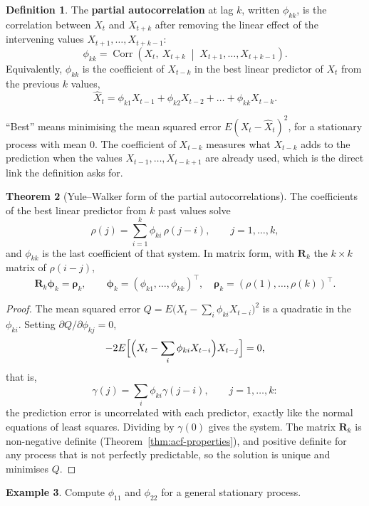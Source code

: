 \documentclass[11pt,a4paper]{article}
\theoremstyle{definition}
\newtheorem{thm}{Theorem}[subsection]
\newtheorem{defn}[thm]{Definition}
\newtheorem{exa}[thm]{Example}
\DeclareMathOperator{\Corr}{Corr}
\begin{document}
\begin{defn}
The \textbf{partial autocorrelation} at lag $k$, written $\phi_{kk}$, is the correlation between $X_t$ and $X_{t+k}$ after removing the
linear effect of the intervening values $X_{t+1}, \dots, X_{t+k-1}$:
\[
\phi_{kk} = \Corr\left(X_t, \ X_{t+k} \;\middle|\; X_{t+1}, \dots, X_{t+k-1}\right) .
\]
Equivalently, $\phi_{kk}$ is the coefficient of $X_{t-k}$ in the best linear predictor of $X_t$ from the previous $k$ values,
\[
\hat X_t = \phi_{k1}X_{t-1} + \phi_{k2}X_{t-2} + \dots + \phi_{kk}X_{t-k} .
\]
\end{defn}

``Best'' means minimising the mean squared error $E(X_t - \hat X_t)^2$, for a stationary process with mean $0$. The coefficient of $X_{t-k}$
measures what $X_{t-k}$ adds to the prediction when the values $X_{t-1}, \dots, X_{t-k+1}$ are already used, which is the direct link the
definition asks for.

\begin{thm}[Yule--Walker form of the partial autocorrelations]\label{thm:pacf-yw}
The coefficients of the best linear predictor from $k$ past values solve
\[
\rho(j) = \sum_{i=1}^{k}\phi_{ki}\,\rho(j - i) , \qquad j = 1, \dots, k ,
\]
and $\phi_{kk}$ is the last coefficient of that system. In matrix form, with $\mathbf{R}_k$ the $k \times k$ matrix of $\rho(i - j)$,
\[
\mathbf{R}_k\boldsymbol\phi_k = \boldsymbol\rho_k , \qquad \boldsymbol\phi_k = (\phi_{k1}, \dots, \phi_{kk})^\top , \quad \boldsymbol\rho_k = (\rho(1), \dots, \rho(k))^\top .
\]
\end{thm}

\begin{proof}
The mean squared error $Q = E\bigl(X_t - \sum_i\phi_{ki}X_{t-i}\bigr)^2$ is a quadratic in the $\phi_{ki}$. Setting $\partial Q/\partial\phi_{kj} = 0$,
\[
-2E\Bigl[\Bigl(X_t - \sum_i\phi_{ki}X_{t-i}\Bigr)X_{t-j}\Bigr] = 0 ,
\]
that is,
\[
\gamma(j) = \sum_i\phi_{ki}\gamma(j - i) , \qquad j = 1, \dots, k :
\]
the prediction error is uncorrelated with each predictor, exactly like the normal equations of least squares.
Dividing by $\gamma(0)$ gives the system. The matrix $\mathbf{R}_k$ is non-negative definite (Theorem~\ref{thm:acf-properties}), and positive definite for
any process that is not perfectly predictable, so the solution is unique and minimises $Q$.
\end{proof}

\begin{exa}\label{exa:pacf12}
Compute $\phi_{11}$ and $\phi_{22}$ for a general stationary process.
\end{exa}
\end{document}
